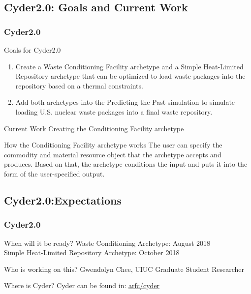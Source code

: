 \subsection{Cyder2.0: Goals and Current Work}
\begin{frame}
  \frametitle{Cyder2.0}

\begin{block}{Goals for Cyder2.0}
\begin{enumerate}
	\item Create a Waste Conditioning Facility archetype and a Simple Heat-Limited Repository archetype that can be optimized to load waste packages into the repository based on a thermal constraints. 
	\item Add both archetypes into the Predicting the Past \Cyclus simulation to simulate loading U.S. nuclear waste packages into a final waste repository. 
\end{enumerate}
\end{block}

\begin{block}{Current Work}
	Creating the Conditioning Facility archetype
\end{block}

\begin{block}{How the Conditioning Facility archetype works}
The user can specify the commodity and material resource object that the archetype accepts and produces. Based on that, the archetype conditions the input and puts it into the form of the user-specified output.
\end{block}

\end{frame}

\subsection{Cyder2.0:Expectations}

\begin{frame}
\frametitle{Cyder2.0}

\begin{block}{When will it be ready?}
	Waste Conditioning Archetype: August 2018 \\
	Simple Heat-Limited Repository Archetype: October 2018 
\end{block}

\begin{block}{Who is working on this?}
	Gwendolyn Chee, UIUC Graduate Student Researcher
\end{block}

\begin{block}{Where is Cyder?}
	Cyder can be found in: \href{https://github.com/arfc/cyder}{arfc/cyder} 
\end{block}

\end{frame}